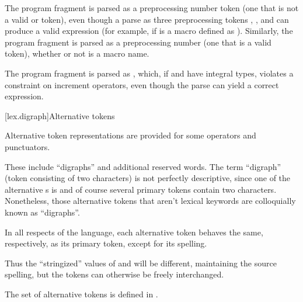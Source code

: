 \pnum
\begin{example}
The program fragment  is parsed as a
preprocessing number token (one that is not a valid
 or  token),
even though a parse as three preprocessing tokens
, \tcode{+}, and  can produce a valid expression (for example,
if  is a macro defined as ). Similarly, the
program fragment  is parsed as a preprocessing number (one
that is a valid  token),
whether or not  is a macro name.
\end{example}

\pnum
\begin{example}
The program fragment  is parsed as , which, if  and  have integral types,
violates a constraint on increment operators, even though the parse
 can yield a correct expression.
\end{example}

[lex.digraph]{Alternative tokens}

\pnum
{}%
Alternative token representations are provided for some operators and
punctuators.
\begin{footnote}
%
These include ``digraphs'' and additional reserved words. The term
``digraph'' (token consisting of two characters) is not perfectly
descriptive, since one of the alternative s is
\tcode{\%:\%:} and of course several primary tokens contain two
characters. Nonetheless, those alternative tokens that aren't lexical
keywords are colloquially known as ``digraphs''.
\end{footnote}

\pnum
In all respects of the language, each alternative token behaves the
same, respectively, as its primary token, except for its spelling.
\begin{footnote}
Thus the ``stringized'' values of
\tcode{[} and \tcode{<:} will be different, maintaining the source
spelling, but the tokens can otherwise be freely interchanged.
\end{footnote}
The set of alternative tokens is defined in
.

